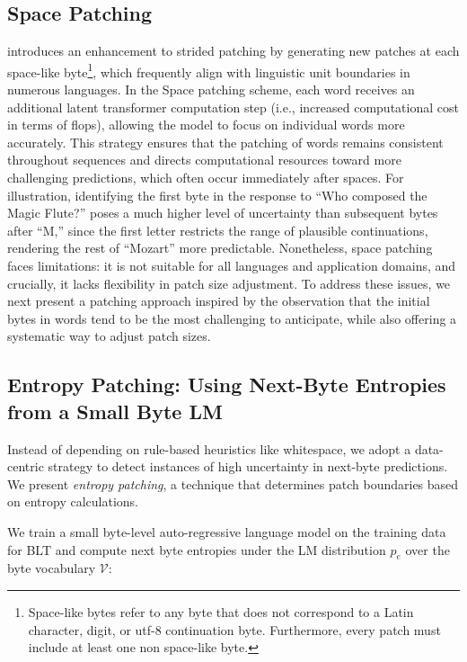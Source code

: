 \subsection{Space Patching}
\label{section:white-patch}

\citet{slagle2024spacebyte} introduces an enhancement to strided patching by generating new patches at each space-like byte\footnote{
    Space-like bytes refer to any byte that does not correspond to a Latin character, digit, or utf-8 continuation byte. Furthermore, every patch must include at least one non space-like byte. }, which frequently align with linguistic unit boundaries in numerous languages. In the Space patching scheme, each word receives an additional latent transformer computation step (i.e., increased computational cost in terms of flops), allowing the model to focus on individual words more accurately. This strategy ensures that the patching of words remains consistent throughout sequences and directs computational resources toward more challenging predictions, which often occur immediately after spaces. For illustration, identifying the first byte in the response to ``Who composed the Magic Flute?\uline{\hspace{.6em}}'' poses a much higher level of uncertainty than subsequent bytes after ``M,'' since the first letter restricts the range of plausible continuations, rendering the rest of ``Mozart'' more predictable. Nonetheless, space patching faces limitations: it is not suitable for all languages and application domains, and crucially, it lacks flexibility in patch size adjustment. To address these issues, we next present a patching approach inspired by the observation that the initial bytes in words tend to be the most challenging to anticipate, while also offering a systematic way to adjust patch sizes.

\subsection{Entropy Patching: Using Next-Byte Entropies from a Small Byte LM}
\label{section:dyn-patch}

Instead of depending on rule-based heuristics like whitespace, we adopt a data-centric strategy to detect instances of high uncertainty in next-byte predictions. We present \textit{entropy patching}, a technique that determines patch boundaries based on entropy calculations.

We train a small byte-level auto-regressive language model on the training data for {\textsc BLT} and compute next byte entropies under the LM distribution $p_{e}$ over the byte vocabulary $\mathcal{V}$:

